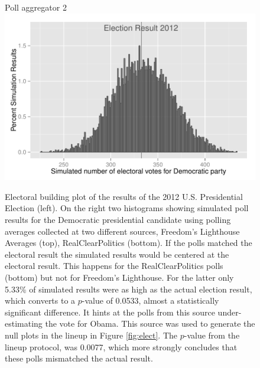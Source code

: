 \documentclass[10pt]{article}\usepackage[]{graphicx}\usepackage[]{color}
\begin{document}
\begin{figure}[hbtp]
\begin{minipage}[c]{0.45\textwidth}
   Poll aggregator 2\\
      \includegraphics[width=\textwidth]{rcp-sim.pdf} 
   \end{minipage}
   \caption{ \label{fig:tower} Electoral building plot of the results of the 2012 U.S. Presidential Election (left). On the right two histograms showing simulated poll results for the Democratic presidential candidate using  polling averages collected at two different sources, Freedom's Lighthouse Averages (top), RealClearPolitics (bottom).  If the polls matched the electoral result the simulated results would be centered at the electoral result. This happens for the RealClearPolitics polls (bottom) but not for Freedom's Lighthouse.  For the latter only 5.33\% of simulated results were as high as the actual election result, which converts to a $p$-value of 0.0533, almost a statistically significant difference. It hints at the polls from this source under-estimating the vote for Obama. This source was used to generate the null plots in the lineup in Figure \ref{fig:elect}. The $p$-value from the lineup protocol, was 0.0077, which more strongly concludes that these polls mismatched the actual result.}
\end{figure}


\end{document}
